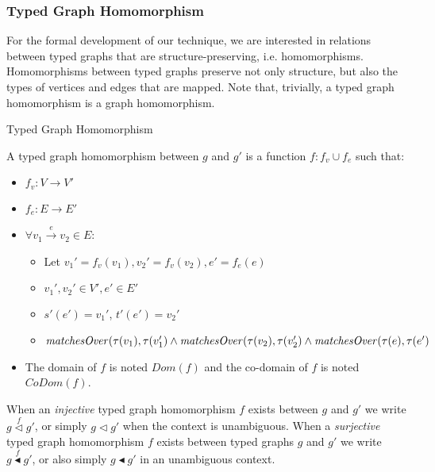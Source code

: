 
\subsubsection*{Typed Graph Homomorphism}
For the formal development of our technique, we are interested in relations between typed graphs that are structure-preserving, i.e. homomorphisms. Homomorphisms between typed graphs preserve not only structure, but also the types of vertices and edges that are mapped. Note that, trivially, a typed graph homomorphism is a graph homomorphism.

\begin{definition}{Typed Graph Homomorphism\\}
\label{def:typed_graph_homomorphism}

A typed graph homomorphism between $g$ and $g'$ is a function $f: f_v \cup f_e$ such that:
\begin{itemize}
\item $f_v: V\rightarrow V'$
\item $f_e: E\rightarrow E'$
\item $\forall v_1 \xrightarrow{e} v_2\in E$:
\begin{itemize}
\item Let $ v_1' = f_v(v_1), v_2' = f_v(v_2), e' = f_e(e)$
\item $v_1', v_2' \in V', e' \in E'$
\item $s'(e') = v_1'$, $t'(e') = v_2'$
\item $\mathit{matchesOver}(\tau(v_1), \tau(v_1') \land \\\mathit{matchesOver}(\tau(v_2), \tau(v_2') \land\\ \mathit{matchesOver}(\tau(e), \tau(e')$
\end{itemize}

\item The domain of $f$ is noted $Dom(f)$ and the co-domain of $f$ is noted $CoDom(f)$.
\end{itemize}  
\end{definition}

 When an \emph{injective} typed graph homomorphism $f$ exists between $g$ and $g'$ we write $g \stackrel{f}{\vartriangleleft} g'$, or simply $g \vartriangleleft g'$ when the context is unambiguous. When a \emph{surjective} typed graph homomorphism $f$ exists between typed graphs $g$ and $g'$ we write $g \stackrel{f}{\blacktriangleleft} g'$, or also simply $g \blacktriangleleft g'$ in an unambiguous context. 

